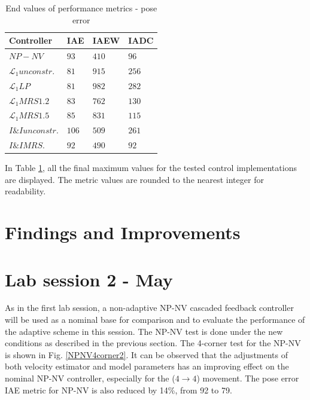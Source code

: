 \begin{table}[h!]
\centering 
\begin{tabular}{| p{2cm} | p{2cm} | p{3cm} | p{2cm}|}
\hline
\textbf{Controller}& \textbf{IAE} &  \textbf{IAEW} &\textbf{IADC}   \\ \hline\hline
$NP-NV$ & $93$ & $410$ & $96$  \\ \hline
$\mathcal{L}_1 unconstr.$ & $81$ & $915$ & $256$  \\ \hline
$\mathcal{L}_1 LP$ & $81$ & $982$ & $282$  \\ \hline
$\mathcal{L}_1 MRS 1.2$ & $83$ & $762$ & $130$  \\ \hline
$\mathcal{L}_1 MRS 1.5$ & $85$ & $831$ & $115$  \\ \hline
$I\&I unconstr. $ & $106$ & $509$ & $261$  \\ \hline
$I\&I MRS. $ & $92$ & $490$ & $92$  \\ \hline
\end{tabular}
\caption{End values of performance metrics - pose error}
\label{performancemetrics1}
\end{table}
In Table \ref{performancemetrics1}, all the final maximum values for the tested control implementations are displayed. The metric values are rounded to the nearest integer for readability.
   

\section{Findings and Improvements}





\newpage
\newpage
\section{Lab session 2 - May}

As in the first lab session, a non-adaptive NP-NV cascaded feedback controller will be used as a nominal base for comparison and to evaluate the performance of the adaptive scheme in this session. The NP-NV test is done under the new conditions as described in the previous section. The 4-corner test for the NP-NV is shown in Fig.  \ref{NPNV4corner2}. It can be observed that the adjustments of both velocity estimator and model parameters has an improving effect on the nominal NP-NV controller, especially for the ($4 \xrightarrow{} 4$) movement. The pose error IAE metric for NP-NV is also reduced by 14\%, from 92 to 79. 

